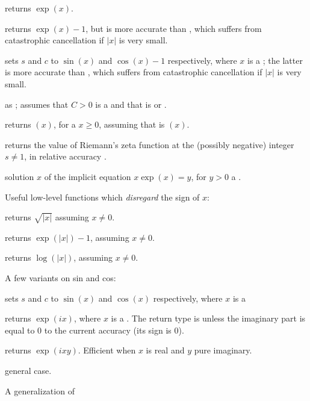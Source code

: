  returns $\exp(x)$.

 returns $\exp(x)-1$, but is more accurate than
, which suffers from catastrophic cancellation if
$|x|$ is very small.

 sets $s$ and $c$ to
$\sin(x)$ and $\cos(x)-1$ respectively, where $x$ is a ; the latter
is more accurate than , which suffers from
catastrophic cancellation if $|x|$ is very small.

 as ; assumes
that $C > 0$ is a  and that  is  or .

 returns $(x)$, for a 
$x\geq 0$, assuming that  is $(x)$.

 returns the value of Riemann's zeta
function at the (possibly negative) integer $s\neq 1$, in relative accuracy
.

 solution $x$ of the implicit equation
$x \exp(x) = y$, for $y > 0$ a .

\noindent Useful low-level functions which \emph{disregard} the sign of $x$:

 returns $\sqrt{|x|}$ assuming $x\neq 0$.

 returns $\exp(|x|) - 1$, assuming $x \neq 0$.

 returns $\log(|x|)$, assuming $x \neq 0$.

\noindent A few variants on sin and cos:

 sets $s$ and $c$ to
$\sin(x)$ and $\cos(x)$ respectively, where $x$ is a 

 returns $\exp(ix)$, where $x$ is a .
The return type is  unless the imaginary part is equal to $0$
to the current accuracy (its sign is $0$).

 returns $\exp(ixy)$. Efficient
when $x$ is real and $y$ pure imaginary.

 general case.

\noindent A generalization of 

